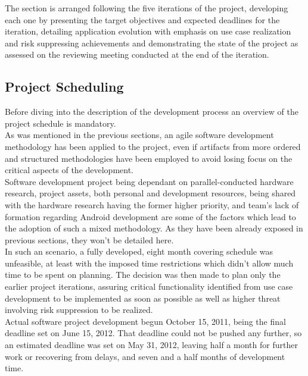 		The section is arranged following the five iterations of the project, developing each one by presenting the target objectives and expected deadlines for the iteration, detailing application evolution with emphasis on use case realization and risk suppressing achievements and demonstrating the state of the project as assessed on the reviewing meeting conducted at the end of the iteration.

		\subsection{Project Scheduling}
			
			Before diving into the description of the development process an overview of the project schedule %
			is mandatory.\\

			As was mentioned in the previous sections, an agile software development methodology has been applied to the project, even if artifacts from more ordered and structured methodologies have been employed to avoid losing focus on the critical aspects of the development.\\
	
			Software development project being dependant on parallel-conducted hardware research, project assets, both personal and development resources, being shared with the hardware research having the former higher priority, and team's lack of formation regarding Android development are some of the factors which lead to the adoption of such a mixed methodology. As they have been already exposed in previous sections, they won't be detailed here.\\ %

			In such an scenario, a fully developed, eight month covering schedule was unfeasible, at least with the imposed time restrictions which didn't allow much time to be spent on planning. The decision was then made to plan only the earlier project iterations, assuring critical functionality identified from use case development to be implemented as soon as possible as well as higher threat involving risk suppression to be realized.\\

			Actual software project development begun October 15, 2011, being the final deadline set on June 15, 2012. That deadline could not be pushed any further, so an estimated deadline was set on May 31, 2012, leaving half a month for further work or recovering from delays, and seven and a half months of development time.\\
		
